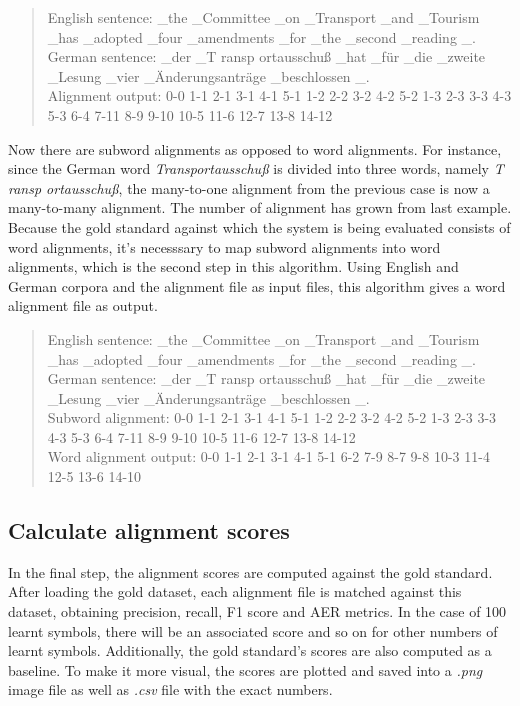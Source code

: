 \begin{quote}
	English sentence: \_the \_Committee \_on \_Transport \_and \_Tourism \_has \_adopted \_four \_amendments \_for \_the \_second \_reading \_.\\
	German sentence: \_der \_T ransp ortausschuß \_hat \_für \_die \_zweite \_Lesung \_vier \_Änderungsanträge \_beschlossen \_.\\
	Alignment output: 0-0 1-1 2-1 3-1 4-1 5-1 1-2 2-2 3-2 4-2 5-2 1-3 2-3 3-3 4-3 5-3 6-4 7-11 8-9 9-10 10-5 11-6 12-7 13-8 14-12
\end{quote}

Now there are subword alignments as opposed to word alignments. For instance, since the German word \emph{Transportausschuß} is divided into three words, namely \emph{T ransp ortausschuß}, the many-to-one alignment from the previous case is now a many-to-many alignment. The number of alignment has grown from last example. Because the gold standard against which the system is being evaluated consists of word alignments, it's necesssary to map subword alignments into word alignments, which is the second step in this algorithm. Using English and German corpora and the alignment file as input files, this algorithm gives a word alignment file as output.

\begin{quote}
	English sentence: \_the \_Committee \_on \_Transport \_and \_Tourism \_has \_adopted \_four \_amendments \_for \_the \_second \_reading \_.\\
	German sentence: \_der \_T ransp ortausschuß \_hat \_für \_die \_zweite \_Lesung \_vier \_Änderungsanträge \_beschlossen \_.\\
	Subword alignment: 0-0 1-1 2-1 3-1 4-1 5-1 1-2 2-2 3-2 4-2 5-2 1-3 2-3 3-3 4-3 5-3 6-4 7-11 8-9 9-10 10-5 11-6 12-7 13-8 14-12\\
	Word alignment output: 0-0 1-1 2-1 3-1 4-1 5-1 6-2 7-9 8-7 9-8 10-3 11-4 12-5 13-6 14-10
\end{quote}

\subsection{Calculate alignment scores}

In the final step, the alignment scores are computed against the gold standard. After loading the gold dataset, each alignment file is matched against this dataset, obtaining precision, recall, F1 score and AER metrics. In the case of 100 learnt symbols, there will be an associated score and so on for other numbers of learnt symbols. Additionally, the gold standard's scores are also computed as a baseline. To make it more visual, the scores are plotted and saved into a \emph{.png} image file as well as \emph{.csv} file with the exact numbers.

